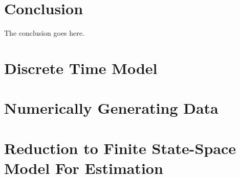 \documentclass[onecolumn,draftcls]{IEEEtran}
\begin{document}
\section{Conclusion}
The conclusion goes here.

\appendices

\section{Discrete Time Model}

\section{Numerically Generating Data}

\section{Reduction to Finite State-Space Model For Estimation}
\end{document}
